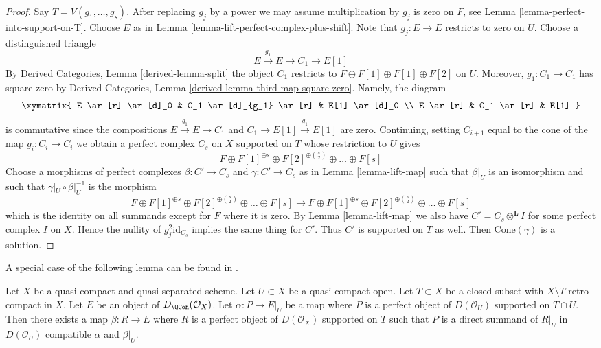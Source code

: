\begin{proof}
Say $T = V(g_1, \ldots, g_s)$. After replacing $g_j$ by a power we
may assume multiplication by $g_j$ is zero on $F$, see
Lemma \ref{lemma-perfect-into-support-on-T}. Choose $E$ as in
Lemma \ref{lemma-lift-perfect-complex-plus-shift}.
Note that $g_j : E \to E$ restricts to zero on $U$.
Choose a distinguished triangle
$$
E \xrightarrow{g_1} E \to C_1 \to E[1]
$$
By Derived Categories, Lemma \ref{derived-lemma-split}
the object $C_1$ restricts to
$F \oplus F[1] \oplus F[1] \oplus F[2]$ on $U$.
Moreover, $g_1 : C_1 \to C_1$ has square zero by
Derived Categories, Lemma \ref{derived-lemma-third-map-square-zero}.
Namely, the diagram
$$
\xymatrix{
E \ar[r] \ar[d]_0 & C_1 \ar[d]_{g_1} \ar[r] & E[1] \ar[d]_0 \\
E \ar[r] & C_1 \ar[r] & E[1]
}
$$
is commutative since the compositions $E \xrightarrow{g_1} E \to C_1$ and
$C_1 \to E[1] \xrightarrow{g_1} E[1]$ are zero. Continuing, setting
$C_{i + 1}$ equal to the cone of the map $g_i : C_i \to C_i$ we obtain
a perfect complex $C_s$ on $X$ supported on $T$
whose restriction to $U$ gives
$$
F \oplus F[1]^{\oplus s} \oplus F[2]^{\oplus {s \choose 2}}
\oplus \ldots \oplus F[s]
$$
Choose a morphisms of perfect complexes $\beta : C' \to C_s$
and $\gamma : C' \to C_s$ as in Lemma \ref{lemma-lift-map}
such that $\beta|_U$ is an isomorphism and such that
$\gamma|_U \circ \beta|_U^{-1}$ is the morphism
$$
F \oplus F[1]^{\oplus s} \oplus F[2]^{\oplus {s \choose 2}}
\oplus \ldots \oplus F[s]
\to
F \oplus F[1]^{\oplus s} \oplus F[2]^{\oplus {s \choose 2}}
\oplus \ldots \oplus F[s]
$$
which is the identity on all summands except for $F$ where it is zero.
By Lemma \ref{lemma-lift-map} we also have
$C' = C_s \otimes^\mathbf{L} I$ for some perfect complex
$I$ on $X$. Hence the nullity of $g_j^2\text{id}_{C_s}$ implies the
same thing for $C'$. Thus $C'$ is supported on $T$ as well.
Then $\text{Cone}(\gamma)$ is a solution.
\end{proof}

\noindent
A special case of the following lemma can be found in
\cite{Neeman-Grothendieck}.

\begin{lemma}
\label{lemma-lift-map-from-perfect-complex-with-support}
Let $X$ be a quasi-compact and quasi-separated scheme.
Let $U \subset X$ be a quasi-compact open. Let $T \subset X$
be a closed subset with $X \setminus T$ retro-compact in $X$.
Let $E$ be an object of $D_\QCoh(\mathcal{O}_X)$.
Let $\alpha : P \to E|_U$ be a map where $P$ is a perfect object of
$D(\mathcal{O}_U)$ supported on $T \cap U$. Then there exists a map
$\beta : R \to E$ where $R$ is a perfect object of $D(\mathcal{O}_X)$
supported on $T$ such that $P$ is a direct summand of $R|_U$ in
$D(\mathcal{O}_U)$ compatible $\alpha$ and $\beta|_U$.
\end{lemma}

